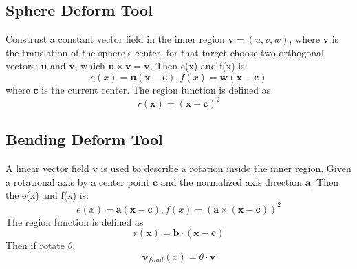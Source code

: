 \documentclass{article}
\theoremstyle{definition}
\theoremstyle{remark}
\begin{document}
\subsection{Sphere Deform Tool}
Construst a constant vector field in the inner region $\textbf{v}=(u, v, w)$, where $\textbf{v}$ is the translation of the sphere's center, for that target choose two orthogonal vectors: $\textbf{u}$ and $\textbf{v}$, which $\textbf{u} \times \textbf{v} = \textbf{v}$. Then e(x) and f(x) is:
\begin{equation}
  e(x)=\textbf{u}(\textbf{x}-\textbf{c}), f(x)=\textbf{w}(\textbf{x}-\textbf{c})
\end{equation}
where $\textbf{c}$ is the current center. The region function is defined as
\begin{equation}
  r(\textbf{x}) = (\textbf{x}-\textbf{c})^2
\end{equation}
\subsection{Bending Deform Tool}
A linear vector field v is used to describe a rotation inside the inner region. Given a rotational axis by a center point $\textbf{c}$ and the normalized axis direction $\textbf{a}$, Then the e(x) and f(x) is:
\begin{equation}
  e(x) = \textbf{a}(\textbf{x}-\textbf{c}), f(x)= (\textbf{a} \times (\textbf{x} - \textbf{c}))^2
\end{equation}
The region function is defined as
\begin{equation}
  r(\textbf{x}) = \textbf{b} \cdot (\textbf{x}-\textbf{c})
\end{equation}
Then if rotate $\theta$,
\begin{equation}
  \textbf{v}_{final}(x) = \theta \cdot \textbf{v}
\end{equation}







\end{document}
